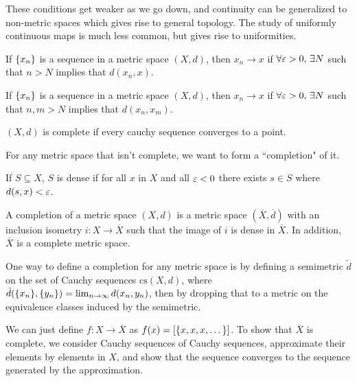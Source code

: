 These conditions get weaker as we go down, and continuity can be generalized to non-metric spaces which gives rise to general topology. The study of uniformly continuous maps is much less common, but gives rise to uniformities.

\begin{definition}[Convergence]
    If $\qty{x_n}$ is a sequence in a metric space $(X, d)$, then $x_n \to x$ if $\forall \varepsilon > 0,\, \exists N$ such that $n > N$ implies that $d(x_n, x)$.
\end{definition}

\begin{definition}
    If $\qty{x_n}$ is a sequence in a metric space $(X, d)$, then $x_n \to x$ if $\forall \varepsilon > 0,\, \exists N$ such that $n, m > N$ implies that $d(x_n, x_m)$.
\end{definition}

\begin{definition}[Completeness]
    $(X, d)$ is complete if every cauchy sequence converges to a point.
\end{definition}

For any metric space that isn't complete, we want to form a ``completion" of it.

\begin{definition}[Density]
   If $S \subseteq X$, $S$ is dense if for all $x$ in $X$ and all $\varepsilon < 0$ there exists $s \in S$ where $d(s, x) < \varepsilon$.
\end{definition}

\begin{definition}[Completion]
    A completion of a metric space $(X, d)$ is a metric space $(\overline X, \overline d)$ with an inclusion isometry $i \colon X \to \overline{X}$ such that the image of $i$ is dense in $\overline{X}$. In addition, $\overline{X}$ is a complete metric space.
\end{definition}

One way to define a completion for any metric space is by defining a semimetric $\tilde d$ on the set of Cauchy sequences $\mathrm{cs}(X, d)$, where $\tilde d\qty(\qty{x_n}, \qty{y_n}) = \lim_{n \to \infty} d(x_n, y_n)$, then by dropping that to a metric on the equivalence classes induced by the semimetric.

We can just define $f \colon X \to \overline X$ as $f(x) = [\qty{x, x, x, \dots}]$. To show that $\overline X$ is complete, we consider Cauchy sequences of Cauchy sequences, approximate their elements by elements in $X$, and show that the sequence converges to the sequence generated by the approximation.


